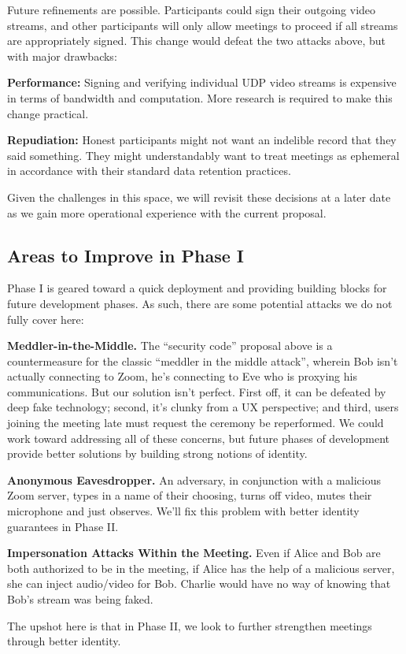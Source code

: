 Future refinements are possible. Participants could sign their outgoing video streams, and other participants will only allow meetings to proceed if all streams are appropriately signed. This change would defeat the two attacks above, but with major drawbacks:
%
\begin{description}
    \item {\bf Performance:} Signing and verifying individual UDP video streams is expensive in terms of bandwidth and computation. More research is required to make this change practical.
    \item {\bf Repudiation:} Honest participants might not want an indelible record that they said something. They might understandably want to treat meetings as ephemeral in accordance with their standard data retention practices.
\end{description}

Given the challenges in this space, we will revisit these decisions at a later date as we gain more operational experience with the current proposal.

\subsection{Areas to Improve in Phase I}
Phase I is geared toward a quick deployment and providing building blocks for future development phases. As such, there are some potential attacks we do not fully cover here:
\begin{description}
\item {\bf Meddler-in-the-Middle.} The ``security code'' proposal above is a countermeasure for the classic ``meddler in the middle attack'', wherein Bob isn't actually connecting to Zoom, he's connecting to Eve who is proxying his communications. But our solution isn't perfect. First off, it can be defeated by deep fake technology; second, it's clunky from a UX perspective; and third, users joining the meeting late must request the ceremony be reperformed. We could work toward addressing all of these concerns, but future phases of development provide better solutions by building strong notions of identity.
\item {\bf Anonymous Eavesdropper.} An adversary, in conjunction with a malicious Zoom server, types in a name of their choosing, turns off video, mutes their microphone and just observes. We'll fix this problem with better identity guarantees in Phase II.
\item {\bf Impersonation Attacks Within the Meeting.} Even if Alice and Bob are both authorized to be in the meeting, if Alice has the help of a malicious server, she can inject audio/video for Bob. Charlie would have no way of knowing that Bob's stream was being faked.
\end{description}

The upshot here is that in Phase II, we look to further strengthen meetings through better identity.